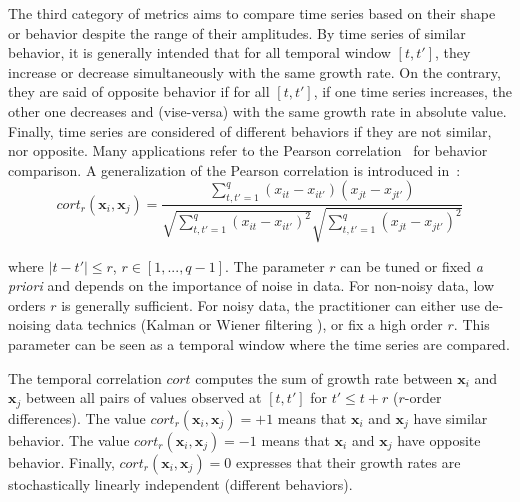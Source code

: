 The third category of metrics aims to compare time series based on their shape or behavior despite the range of their amplitudes. By time series of similar behavior, it is generally intended that for all temporal window $[t,t']$, they increase or decrease simultaneously with the same growth rate. On the contrary, they are said of opposite behavior if for all $[t,t']$, if one time series increases, the other one decreases and (vise-versa) with the same growth rate in absolute value. Finally, time series are considered of different behaviors if they are not similar, nor opposite. Many applications refer to the Pearson correlation~\cite{Abraham2010a,Benesty2009} for behavior comparison. A generalization of the Pearson correlation is introduced in~\cite{Douzal-Chouakria2003,AhlameDouzal-Chouakria2012,Chouakria2007}: 
\begin{equation}	
	cort_r(\textbf{x}_i,\textbf{x}_j) = 
	\frac{
		\sum\limits_{t,t'=1}^q 
		{
			(x_{it}-x_{it'})
			(x_{jt}-x_{jt'})
		}
	}
	{
		\sqrt{
			\sum\limits_{t,t'=1}^q  
			{(x_{it}-x_{it'})^2}
		} 
		\sqrt{
			\sum\limits_{t,t'=1}^q  
			{(x_{jt}-x_{jt'})^2}
		} 	 
	}
\label{eq:corTr}
\end{equation}

\noindent where $|t-t'| \leq r$, $r \in [1,..., q-1]$. The parameter $r$ can be tuned or fixed \textit{a priori} and depends on the importance of noise in data. For non-noisy data, low orders $r$ is generally sufficient. For noisy data, the practitioner can either use de-noising data technics (Kalman or Wiener filtering \cite{Kalman1960,WienerN1942}), or fix a high order $r$. This parameter can be seen as a temporal window where the time series are compared.


The temporal correlation $cort$ computes the sum of growth rate between $\textbf{x}_i$ and $\textbf{x}_j$ between all pairs of values observed at $[t ,t']$ for $t' \leq t+r$ ($r$-order differences). The value $cort_r(\textbf{x}_i,\textbf{x}_j) = +1$ means that $\textbf{x}_i$ and $\textbf{x}_j$  have similar behavior. The value $cort_r(\textbf{x}_i,\textbf{x}_j) = -1$ means that $\textbf{x}_i$ and $\textbf{x}_j$ have opposite behavior. Finally, $cort_r(\textbf{x}_i,\textbf{x}_j) = 0$ expresses that their growth rates are stochastically linearly independent (different behaviors). 

